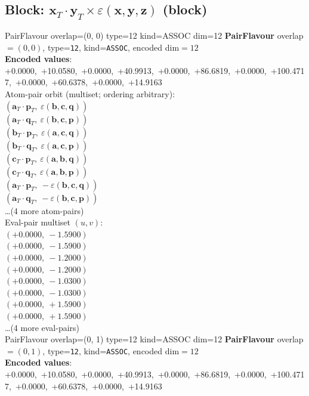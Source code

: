 \documentclass[a4paper,11pt]{article}
\newcommand{\fpbeomcfokjooi}[2]{\mathbf{#1}_T \cdot \mathbf{#2}_T}
\newcommand{\kblbmcpggoncpf}[3]{\varepsilon(\mathbf{#1},\mathbf{#2},\mathbf{#3})}
\begin{document}
\subsection{Block: $\fpbeomcfokjooi{x}{y} \times \kblbmcpggoncpf{x}{y}{z}$  (block)}
    PairFlavour  overlap=(0, 0)  type=12  kind=ASSOC  dim=12
\textbf{PairFlavour} overlap$=(0, 0)$, type=\texttt{12}, kind=\texttt{ASSOC}, encoded dim$=12$\\
\textbf{      Encoded values}: +0.0000,\ +10.0580,\ +0.0000,\ +40.9913,\ +0.0000,\ +86.6819,\ +0.0000,\ +100.4717,\ +0.0000,\ +60.6378,\ +0.0000,\ +14.9163\\
\quad Atom-pair orbit (multiset; ordering arbitrary):\\
$(\fpbeomcfokjooi{a}{p},\ \kblbmcpggoncpf{b}{c}{q})$\\
$(\fpbeomcfokjooi{a}{q},\ \kblbmcpggoncpf{b}{c}{p})$\\
$(\fpbeomcfokjooi{b}{p},\ \kblbmcpggoncpf{a}{c}{q})$\\
$(\fpbeomcfokjooi{b}{q},\ \kblbmcpggoncpf{a}{c}{p})$\\
$(\fpbeomcfokjooi{c}{p},\ \kblbmcpggoncpf{a}{b}{q})$\\
$(\fpbeomcfokjooi{c}{q},\ \kblbmcpggoncpf{a}{b}{p})$\\
$(\fpbeomcfokjooi{a}{p},\ -\kblbmcpggoncpf{b}{c}{q})$\\
$(\fpbeomcfokjooi{a}{q},\ -\kblbmcpggoncpf{b}{c}{p})$\\
\quad \ldots (4 more atom-pairs)\\
\quad Eval-pair multiset $(u, v)$:\\
$(+0.0000,\ -1.5900)$\\
$(+0.0000,\ -1.5900)$\\
$(+0.0000,\ -1.2000)$\\
$(+0.0000,\ -1.2000)$\\
$(+0.0000,\ -1.0300)$\\
$(+0.0000,\ -1.0300)$\\
$(+0.0000,\ +1.5900)$\\
$(+0.0000,\ +1.5900)$\\
\quad \ldots (4 more eval-pairs)\\
    PairFlavour  overlap=(0, 1)  type=12  kind=ASSOC  dim=12
\textbf{PairFlavour} overlap$=(0, 1)$, type=\texttt{12}, kind=\texttt{ASSOC}, encoded dim$=12$\\
\textbf{      Encoded values}: +0.0000,\ +10.0580,\ +0.0000,\ +40.9913,\ +0.0000,\ +86.6819,\ +0.0000,\ +100.4717,\ +0.0000,\ +60.6378,\ +0.0000,\ +14.9163\\
\end{document}
